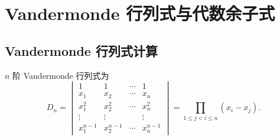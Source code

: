 \section{Vandermonde 行列式与代数余子式}

\subsection{Vandermonde 行列式计算}

\begin{theorem}
    $n$ 阶 Vandermonde 行列式为
    $$D_n=
        \begin{vmatrix}
            1         & 1         & \cdots & 1         \\
            x_1       & x_2       & \cdots & x_n       \\
            x_1^2     & x_2^2     & \cdots & x_n^2     \\
            \vdots    & \vdots    &        & \vdots    \\
            x_1^{n-1} & x_2^{n-1} & \cdots & x_n^{n-1}
        \end{vmatrix}
        =\prod_{1\leqslant j<i\leqslant n}(x_i-x_j).$$
\end{theorem}

